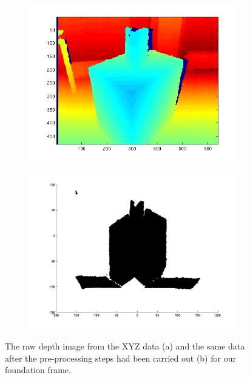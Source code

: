 \begin{figure}[H]
	\centering
	\begin{subfigure}[b]{0.45\textwidth}
		\centering
		\includegraphics[width=\textwidth]{Images/1-rawZImage.png}
		\caption{}
	\end{subfigure}%
	\hspace{1cm}
	\begin{subfigure}[b]{0.45\textwidth}
		\centering
		\includegraphics[width=\textwidth]{Images/3-RangeReduced.png}
		\caption{}
	\end{subfigure}
	\caption{The raw depth image from the XYZ data (a) and the same data after the pre-processing steps had been carried out (b) for our foundation frame.}
	\label{fig:preprocessing}
\end{figure}


